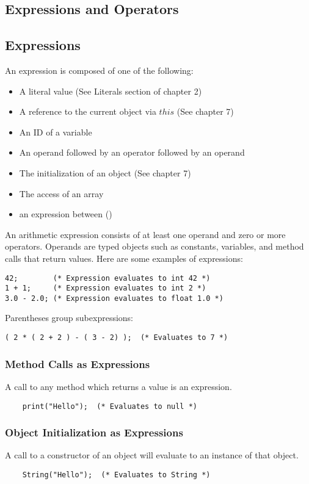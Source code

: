 \begin{homeworkProblem}
	\chapter{Expressions and Operators}
	\section{Expressions}
	
	An expression is composed of one of the following:
	\begin{itemize}
		\item A literal value (See Literals section of chapter 2)
		\item A reference to the current object via $this$ (See chapter 7)
		\item An ID of a variable
		\item An operand followed by an operator followed by an operand
		\item The initialization of an object (See chapter 7)
		\item The access of an array
		\item an expression between ()
	\end{itemize}
	
	An arithmetic expression consists of at least one operand and zero or more operators. Operands are typed objects such as constants, variables, and method calls that return values. Here are some examples of expressions: 
	
	\begin{verbatim}
42;        (* Expression evaluates to int 42 *)
1 + 1;     (* Expression evaluates to int 2 *)
3.0 - 2.0; (* Expression evaluates to float 1.0 *)
	\end{verbatim}

	
	Parentheses group subexpressions:
	\begin{verbatim}
( 2 * ( 2 + 2 ) - ( 3 - 2) );  (* Evaluates to 7 *)
	\end{verbatim} 
	
	\subsection{Method Calls as Expressions}
	A call to any method which returns a value is an expression.
	\begin{verbatim}
	print("Hello");  (* Evaluates to null *)
	\end{verbatim} 
	
	\subsection{Object Initialization as Expressions}
	A call to a constructor of an object will evaluate to an instance of that object.
	\begin{verbatim}
	String("Hello");  (* Evaluates to String *)
	\end{verbatim}
	

\end{homeworkProblem}
